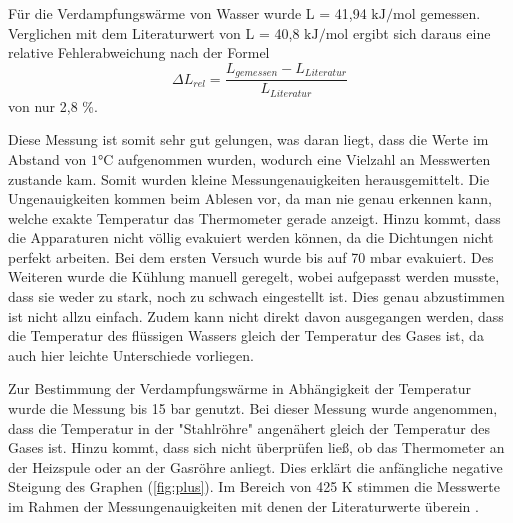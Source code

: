 Für die Verdampfungswärme von Wasser wurde L = 41,94 $\si{\kilo \joule \per \mol}$
gemessen. Verglichen mit dem Literaturwert von L = 40,8 $\si{\kilo \joule \per \mol}$
\cite{chemie} ergibt sich daraus eine relative Fehlerabweichung nach der Formel
\begin{equation}
  \Delta L_{rel} = \frac{L_{gemessen}-L_{Literatur}}{L_{Literatur}}
\end{equation}
von nur 2,8 \%.

Diese Messung ist somit sehr gut gelungen, was daran liegt, dass die
Werte im Abstand von $1 \si{\celsius}$ aufgenommen wurden, wodurch eine Vielzahl
an Messwerten zustande kam. Somit wurden kleine Messungenauigkeiten herausgemittelt.
Die Ungenauigkeiten kommen beim Ablesen vor, da man nie genau erkennen kann, welche
exakte Temperatur das Thermometer gerade anzeigt. Hinzu kommt, dass die Apparaturen
nicht völlig evakuiert werden können, da die Dichtungen nicht perfekt arbeiten. Bei
dem ersten Versuch wurde bis auf 70 $\si{\milli \bar}$ evakuiert. Des Weiteren
wurde die Kühlung manuell geregelt, wobei aufgepasst werden musste, dass sie weder
zu stark, noch zu schwach eingestellt ist. Dies genau abzustimmen ist nicht
allzu einfach. Zudem kann nicht direkt davon ausgegangen werden, dass die Temperatur
des flüssigen Wassers gleich der Temperatur des Gases ist, da auch hier leichte
Unterschiede vorliegen.

Zur Bestimmung der Verdampfungswärme in Abhängigkeit der Temperatur wurde die Messung
bis 15 bar genutzt. Bei dieser Messung wurde angenommen, dass die Temperatur in
der "Stahlröhre" angenähert gleich der Temperatur des Gases ist. Hinzu kommt, dass
sich nicht überprüfen ließ, ob das Thermometer an der Heizspule oder an der Gasröhre
anliegt. Dies erklärt die anfängliche negative Steigung des Graphen (\ref{fig:plus}).
Im Bereich von 425 $\si{\kelvin}$ stimmen die Messwerte im Rahmen der Messungenauigkeiten
mit denen der Literaturwerte überein \cite{chemie}.
